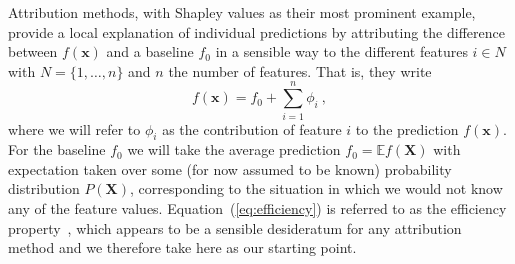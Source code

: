 \documentclass{article}
\newcommand{\vX}{\mathbf{X}}
\newcommand{\vx}{\mathbf{x}}
\newcommand{\expectation}{\mathbb{E}}
\newcommand{\contribution}{{\phi}}
\newcommand{\allfeatures}{{N}}
\begin{document}
Attribution methods, with Shapley values as their most prominent example, provide a local explanation of individual predictions by attributing the difference between $f(\vx)$ and a baseline $f_0$ in a sensible way to the different features $i \in \allfeatures$ with $\allfeatures = \{1,\ldots,n\}$ and $n$ the number of features. That is, they write
\begin{equation}
f(\vx) = f_0 + \sum_{i=1}^n \contribution_i \: ,
\label{eq:efficiency}
\end{equation}
where we will refer to $\contribution_i$ as the contribution of feature $i$ to the prediction $f(\vx)$. For the baseline $f_0$ we will take the average prediction $f_0 = \expectation f(\vX)$ with expectation taken over some (for now assumed to be known) probability distribution $P(\vX)$, corresponding to the situation in which we would not know any of the feature values. Equation~(\ref{eq:efficiency}) is referred to as the efficiency property~\cite{shapley1953value}, which appears to be a sensible desideratum for any attribution method and we therefore take here as our starting point.
\end{document}
